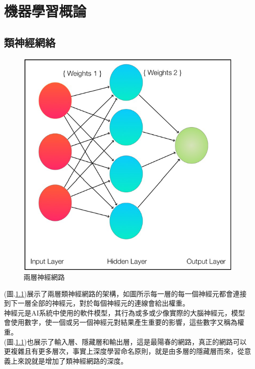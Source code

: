 \documentclass[14pt,a4paper]{report}  %
\begin{document}
\renewcommand{\baselinestretch}{0.5} %
\chapter{機器學習概論}
\section{類神經網絡}
\begin{figure}[hbt!]
\begin{center}
\includegraphics[scale=0.74]{兩層神經網路}
\caption{\Large 兩層神經網路}\label{兩層神經網路}
\end{center}
\end{figure}

 (圖.\ref{兩層神經網路})展示了兩層類神經網路的架構，如圖所示每一層的每一個神經元都會連接到下一層全部的神經元，對於每個神經元的連線會給出權重。\\

 神經元是AI系統中使用的軟件模型，其行為或多或少像實際的大腦神經元，模型會使用數字，使一個或另一個神經元對結果產生重要的影響，這些數字又稱為權重。\\

 (圖.\ref{兩層神經網路})也展示了輸入層、隱藏層和輸出層，這是最陽春的網路，真正的網路可以更複雜且有更多層次，事實上深度學習命名原則，就是由多層的隱藏層而來，從意義上來說就是增加了類神經網路的深度。\\
\end{document}
